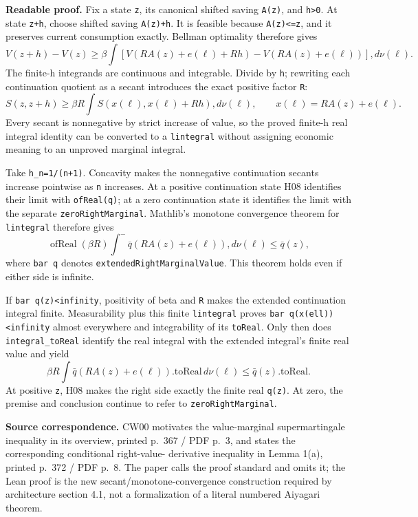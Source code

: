 \documentclass[
  11pt,
]{article}
\let\LedgerOriginalTexttt\texttt
\renewcommand{\texttt}[1]{{\small\LedgerOriginalTexttt{#1}}}
\begin{document}
\textbf{Readable proof.} Fix a state \texttt{z}, its canonical shifted
saving \texttt{A(z)}, and \texttt{h\textgreater{}0}. At state
\texttt{z+h}, choose shifted saving \texttt{A(z)+h}. It is feasible
because \texttt{A(z)\textless{}=z}, and it preserves current consumption
exactly. Bellman optimality therefore gives \[
 V(z+h)-V(z)\geq\beta\int
 [V(RA(z)+e(\ell)+Rh)-V(RA(z)+e(\ell))],d\nu(\ell).
\] The finite-h integrands are continuous and integrable. Divide by
\texttt{h}; rewriting each continuation quotient as a secant introduces
the exact positive factor \texttt{R}: \[
 S(z,z+h)\geq\beta R\int S(x(\ell),x(\ell)+Rh),d\nu(\ell),
 \qquad x(\ell)=RA(z)+e(\ell).
\] Every secant is nonnegative by strict increase of value, so the
proved finite-h real integral identity can be converted to a
\texttt{lintegral} without assigning economic meaning to an unproved
marginal integral.

Take \texttt{h\_n=1/(n+1)}. Concavity makes the nonnegative continuation
secants increase pointwise as \texttt{n} increases. At a positive
continuation state H08 identifies their limit with \texttt{ofReal(q)};
at a zero continuation state it identifies the limit with the separate
\texttt{zeroRightMarginal}. Mathlib's monotone convergence theorem for
\texttt{lintegral} therefore gives \[
 \operatorname{ofReal}(\beta R)\int^- \bar q(RA(z)+e(\ell)),d\nu(\ell)
 \leq \bar q(z),
\] where \texttt{bar\ q} denotes \texttt{extendedRightMarginalValue}.
This theorem holds even if either side is infinite.

If \texttt{bar\ q(z)\textless{}infinity}, positivity of beta and
\texttt{R} makes the extended continuation integral finite.
Measurability plus this finite \texttt{lintegral} proves
\texttt{bar\ q(x(ell))\textless{}infinity} almost everywhere and
integrability of its \texttt{toReal}. Only then does
\texttt{integral\_toReal} identify the real integral with the extended
integral's finite real value and yield \[
 \beta R\int \bar q(RA(z)+e(\ell)).\mathrm{toReal}\,d\nu(\ell)
 \leq \bar q(z).\mathrm{toReal}.
\] At positive \texttt{z}, H08 makes the right side exactly the finite
real \texttt{q(z)}. At zero, the premise and conclusion continue to
refer to \texttt{zeroRightMarginal}.

\textbf{Source correspondence.} CW00 motivates the value-marginal
supermartingale inequality in its overview, printed p.~367 / PDF p.~3,
and states the corresponding conditional right-value- derivative
inequality in Lemma 1(a), printed p.~372 / PDF p.~8. The paper calls the
proof standard and omits it; the Lean proof is the new
secant/monotone-convergence construction required by architecture
section 4.1, not a formalization of a literal numbered Aiyagari theorem.
\end{document}
